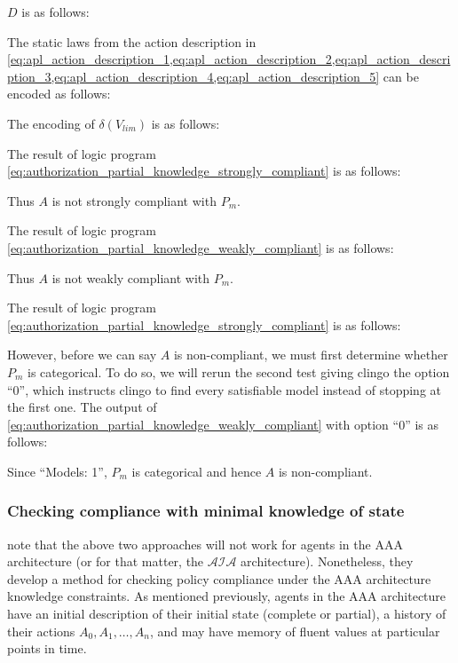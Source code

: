 $D$ is as follows:


The static laws from the action description in \cref{eq:apl_action_description_1,eq:apl_action_description_2,eq:apl_action_description_3,eq:apl_action_description_4,eq:apl_action_description_5} can be encoded as follows:


The encoding of $\delta(V_{lim})$ is as follows:


%

The result of logic program \cref{eq:authorization_partial_knowledge_strongly_compliant} is as follows:

Thus $A$ is not strongly compliant with $P_m$.

The result of logic program \cref{eq:authorization_partial_knowledge_weakly_compliant} is as follows:

Thus $A$ is not weakly compliant with $P_m$.

The result of logic program \cref{eq:authorization_partial_knowledge_strongly_compliant} is as follows:

However, before we can say $A$ is non-compliant, we must first determine whether $P_m$ is categorical.
To do so, we will rerun the second test giving clingo the option ``0'', which instructs clingo to find every satisfiable model instead of stopping at the first one.
The output of \cref{eq:authorization_partial_knowledge_weakly_compliant} with option ``0'' is as follows:

Since ``Models: 1'', $P_m$ is categorical and hence $A$ is non-compliant.

\subsubsection{Checking compliance with minimal knowledge of state}

\citet{gelfond_authorization_2008} note that the above two approaches will not work for agents in the AAA architecture (or for that matter, the $\mathcal{AIA}$ architecture).
Nonetheless, they develop a method for checking policy compliance under the AAA architecture knowledge constraints.
As mentioned previously, agents in the AAA architecture have an initial description of their initial state (complete or partial), a history of their actions $A_0, A_1, \dots, A_n$, and may have memory of fluent values at particular points in time.

